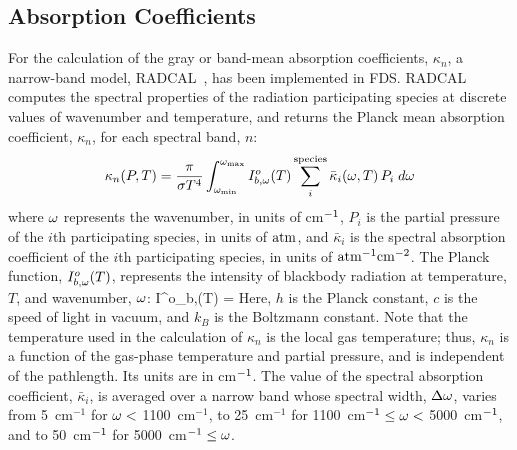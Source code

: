 \subsection{Absorption Coefficients}

For the calculation of the gray or band-mean absorption coefficients,
$\kappa_n$, a narrow-band model, RADCAL~\cite{RadCal}, has been
implemented in FDS. RADCAL computes the spectral properties of the
radiation participating species at discrete values of wavenumber and temperature,
and returns the Planck mean absorption coefficient, $\kappa_n$, for each spectral band, $n$:
\begin{equation}
\kappa_n(P,T) = \dfrac{\pi}{\sigma T^4}
\displaystyle\int_{\omega_{\min}}^{\omega_{\max}}{I^o_{b,\omega}(T)
\displaystyle\sum_{i}^{\rm species} \bar{\kappa}_i(\omega,T) \, P_i \; d\omega}
\end{equation}
where $\omega$ represents the wavenumber, in units of cm$^{\rm -1}$,
$P_i$ is the partial pressure of the $i$th participating species, in units of ${\rm atm}$, and
$\bar{\kappa}_i$ is the spectral absorption coefficient of the $i$th participating species, in units of
${\rm atm^{-1}cm^{-2}}$. The Planck function, $I^o_{b,\omega}(T)$, represents the
intensity of blackbody radiation at temperature, $T$, and wavenumber, $\omega$:
\be
I^o_{b,\om}(T) = 
\ee
Here, $h$ is the Planck constant, $c$ is the speed of light in vacuum, and $k_B$ is the Boltzmann constant.
Note that the temperature used in the calculation of $\kappa_n$ is
the local gas temperature; thus, $\kappa_n$ is a function
of the gas-phase temperature and partial pressure,
and is independent of the pathlength. Its units are in cm$^{\rm -1}$.
The value of the spectral absorption coefficient, $\bar{\kappa}_i$,
is averaged over a narrow band whose spectral width, $\Delta \omega$, varies from
5~cm$^{-1}$ for $\omega < $ 1100~cm$^{-1}$, to
25~cm$^{-1}$ for 1100~cm$^{-1} \leq \omega < $ 5000~cm$^{\rm -1}$,
and to 50~cm$^{\rm -1}$ for 5000~cm$^{\rm -1}\leq \omega$.

